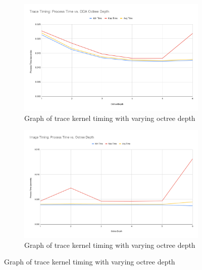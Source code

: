 \documentclass[final]{cmpreport}
\begin{document}
\begin{figure}
    \centering
    \begin{subfigure}{0.5\textwidth}
        \centering
        \includegraphics[width=\linewidth]{img/Trace Timing Process Time vs. DDA Octree Depth.png}
        \caption{Graph of trace kernel timing with varying octree depth}
        \label{graphtracedda}
    \end{subfigure}%
    \begin{subfigure}{0.5\textwidth}
        \centering
        \includegraphics[width=\linewidth]{img/Image Timing Process Time vs. Octree Depth.png}
        \caption{Graph of trace kernel timing with varying octree depth}
        \label{graphimagedda}
    \end{subfigure}
\end{figure}
\end{document}

